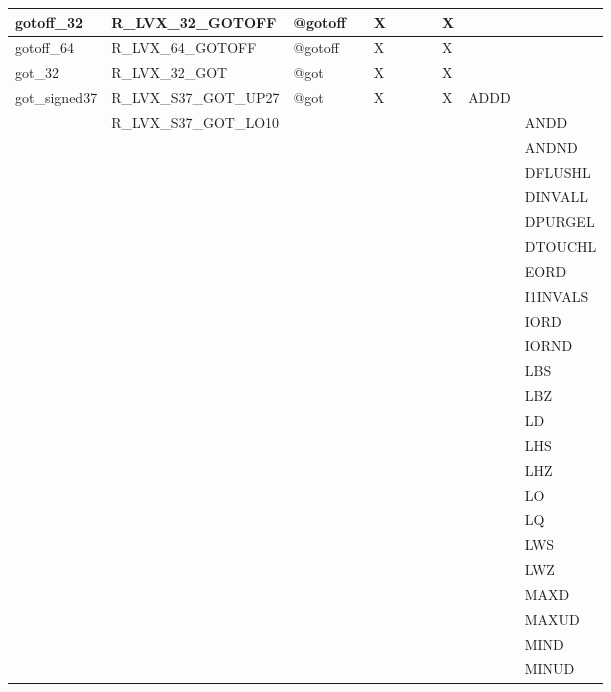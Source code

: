 {\begin{tabular}{|l|l|l|l|l|l|l|l|l|l|l|}
\hline
\textsf{gotoff\_32} & \textsf{R\_LVX\_32\_GOTOFF} & \textsf{@gotoff} & \textsf{} & \textsf{X} & \textsf{} & \textsf{} & \textsf{} & \textsf{X} & \textsf{} \\
\hline
\textsf{gotoff\_64} & \textsf{R\_LVX\_64\_GOTOFF} & \textsf{@gotoff} & \textsf{} & \textsf{X} & \textsf{} & \textsf{} & \textsf{} & \textsf{X} & \textsf{} \\
\hline
\textsf{got\_32} & \textsf{R\_LVX\_32\_GOT} & \textsf{@got} & \textsf{} & \textsf{X} & \textsf{} & \textsf{} & \textsf{} & \textsf{X} & \textsf{} \\
\hline
\textsf{got\_signed37} & \textsf{R\_LVX\_S37\_GOT\_UP27} & \textsf{@got} & \textsf{} & \textsf{X} & \textsf{} & \textsf{} & \textsf{} & \textsf{X} & \textsf{ADDD} \\
 & \textsf{R\_LVX\_S37\_GOT\_LO10} & & & & & & & & & \textsf{ANDD} \\
 & & & & & & & & & & \textsf{ANDND} \\
 & & & & & & & & & & \textsf{DFLUSHL} \\
 & & & & & & & & & & \textsf{DINVALL} \\
 & & & & & & & & & & \textsf{DPURGEL} \\
 & & & & & & & & & & \textsf{DTOUCHL} \\
 & & & & & & & & & & \textsf{EORD} \\
 & & & & & & & & & & \textsf{I1INVALS} \\
 & & & & & & & & & & \textsf{IORD} \\
 & & & & & & & & & & \textsf{IORND} \\
 & & & & & & & & & & \textsf{LBS} \\
 & & & & & & & & & & \textsf{LBZ} \\
 & & & & & & & & & & \textsf{LD} \\
 & & & & & & & & & & \textsf{LHS} \\
 & & & & & & & & & & \textsf{LHZ} \\
 & & & & & & & & & & \textsf{LO} \\
 & & & & & & & & & & \textsf{LQ} \\
 & & & & & & & & & & \textsf{LWS} \\
 & & & & & & & & & & \textsf{LWZ} \\
 & & & & & & & & & & \textsf{MAXD} \\
 & & & & & & & & & & \textsf{MAXUD} \\
 & & & & & & & & & & \textsf{MIND} \\
 & & & & & & & & & & \textsf{MINUD} \\

\end{tabular}}
